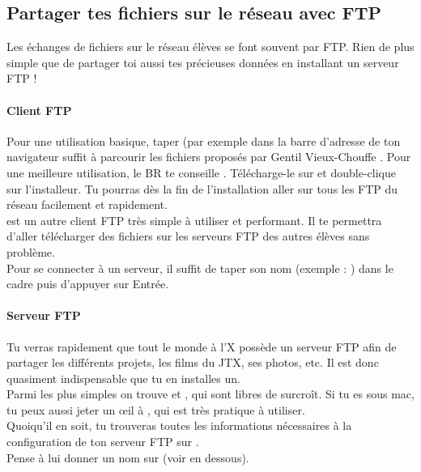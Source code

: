 \subsection{Partager tes fichiers sur le réseau avec FTP}

Les échanges de fichiers sur le réseau élèves se font souvent par FTP. Rien de plus simple que de partager toi aussi tes précieuses données en installant un serveur FTP !

\paragraph{Client FTP}
Pour une utilisation basique, taper   (par exemple  dans la barre d'adresse de ton navigateur suffit à parcourir les fichiers proposés par \og Gentil Vieux-Chouffe \fg.
Pour une meilleure utilisation, le BR te conseille . Télécharge-le sur  et double-clique sur l'installeur.
Tu pourras dès la fin de l'installation aller sur tous les FTP du réseau facilement et rapidement.\\
  est un autre client FTP très simple à  utiliser et performant. Il te permettra d'aller télécharger des fichiers sur les serveurs FTP des autres élèves sans problème.\\
Pour se connecter à  un serveur, il suffit de taper son nom (exemple : ) dans le cadre  puis d'appuyer sur Entrée.\\


\paragraph{Serveur FTP}
Tu verras rapidement que tout le monde à  l'X possède un serveur FTP
afin de partager les différents projets, les films du JTX, ses
photos, etc. Il est donc quasiment indispensable que tu en installes un.\\

Parmi les plus simples on trouve  et , qui sont libres de surcroît.
Si tu es sous mac, tu peux aussi jeter un œ{}il à , qui est très pratique à utiliser.\\
Quoiqu'il en soit, tu trouveras toutes les informations nécessaires à la configuration de ton serveur FTP sur .\\
Pense à lui donner un nom sur  (voir en dessous).

